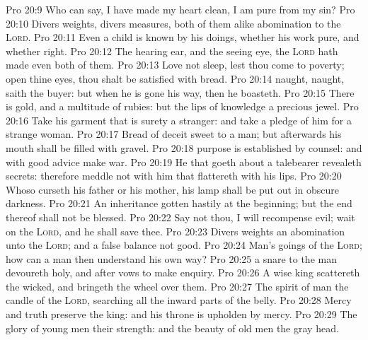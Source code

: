\vs Pro 20:9 Who can say, I have made my heart clean, I am pure from my sin?
\vs Pro 20:10 Divers weights,  divers measures, both of them  alike abomination to the \textsc{Lord}.
\vs Pro 20:11 Even a child is known by his doings, whether his work  pure, and whether  right.
\vs Pro 20:12 The hearing ear, and the seeing eye, the \textsc{Lord} hath made even both of them.
\vs Pro 20:13 Love not sleep, lest thou come to poverty; open thine eyes,  thou shalt be satisfied with bread.
\vs Pro 20:14  naught,  naught, saith the buyer: but when he is gone his way, then he boasteth.
\vs Pro 20:15 There is gold, and a multitude of rubies: but the lips of knowledge  a precious jewel.
\vs Pro 20:16 Take his garment that is surety  a stranger: and take a pledge of him for a strange woman.
\vs Pro 20:17 Bread of deceit  sweet to a man; but afterwards his mouth shall be filled with gravel.
\vs Pro 20:18  purpose is established by counsel: and with good advice make war.
\vs Pro 20:19 He that goeth about  a talebearer revealeth secrets: therefore meddle not with him that flattereth with his lips.
\vs Pro 20:20 Whoso curseth his father or his mother, his lamp shall be put out in obscure darkness.
\vs Pro 20:21 An inheritance  gotten hastily at the beginning; but the end thereof shall not be blessed.
\vs Pro 20:22 Say not thou, I will recompense evil;  wait on the \textsc{Lord}, and he shall save thee.
\vs Pro 20:23 Divers weights  an abomination unto the \textsc{Lord}; and a false balance  not good.
\vs Pro 20:24 Man's goings  of the \textsc{Lord}; how can a man then understand his own way?
\vs Pro 20:25  a snare to the man  devoureth  holy, and after vows to make enquiry.
\vs Pro 20:26 A wise king scattereth the wicked, and bringeth the wheel over them.
\vs Pro 20:27 The spirit of man  the candle of the \textsc{Lord}, searching all the inward parts of the belly.
\vs Pro 20:28 Mercy and truth preserve the king: and his throne is upholden by mercy.
\vs Pro 20:29 The glory of young men  their strength: and the beauty of old men  the gray head.
